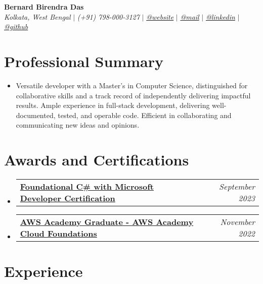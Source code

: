 \documentclass[letterpaper,10pt]{article}
\makeatletter
\newcommand{\sectionspace}{\vspace{-20pt}}
\newcommand{\subheadingtitlevspace}{\vspace{-3pt}}
\newcommand{\titleItem}[1]{\textbf{#1}}
\newcommand{\resumeProjectHeading}[2]{
    \item
    \begin{tabular*}{0.97\textwidth}{l@{\extracolsep{\fill}}r}
        #1 & \textit{ #2} \\
    \end{tabular*}\vspace{-9pt}
}
\newcommand{\resumeSubHeadingListStart}{\subheadingtitlevspace\begin{itemize}[leftmargin=0.15in, label={}]}
\newcommand{\resumeSubHeadingListEnd}{\end{itemize}}
\makeatother
\begin{document}
\begin{flushleft}
    \textbf{\huge Bernard Birendra Das} \\
    \textit{Kolkata, West Bengal} $|$
    \textit{(+91) 798-000-3127} $|$
    \href{https://berniespace.dev}{{\textit{@website}}} $|$
    \href{mailto:bernardbdas@gmail.com}{{\textit{@mail}}} $|$
    \href{https://linkedin.com/in/bernardbdas}{{\textit{@linkedin}}} $|$
    \href{https://github.com/bernardbdas}{{\textit{@github}}}
    \vspace{-8pt}
\end{flushleft}

\section{Professional Summary}
\vspace{-3pt}
\begin{itemize}[leftmargin=0.15in, label={}]
    \item{Versatile developer with a Master's in Computer Science, distinguished for collaborative skills and a track record of independently delivering impactful results. Ample experience in full-stack development, delivering well-documented, tested, and operable code. Efficient in collaborating and communicating new ideas and opinions.}
\end{itemize}
\sectionspace

\section{Awards and Certifications}
    \resumeSubHeadingListStart
        \resumeProjectHeading{\href{https://www.freecodecamp.org/certification/bernardbdas/foundational-c-sharp-with-microsoft}{\titleItem{Foundational C\# with Microsoft Developer Certification}}}{September 2023}
        \resumeProjectHeading{\href{https://www.credly.com/badges/bdf2f146-b8c1-4cc0-b3df-81980f4df784}{\titleItem{AWS Academy Graduate - AWS Academy Cloud Foundations}}}{November 2022}
    \resumeSubHeadingListEnd






\section{Experience}
\end{document}
